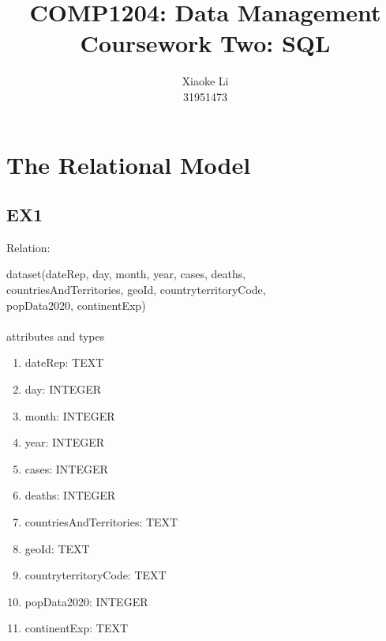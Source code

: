 \documentclass[]{article}
\title{COMP1204: Data Management \\ Coursework Two: SQL }
\author{Xiaoke Li \\ 31951473}
\begin{document}
\maketitle
\newpage

\section{The Relational Model}

\subsection{EX1}

Relation: 


dataset(dateRep, day, month, year, cases, deaths,\\ countriesAndTerritories, geoId, countryterritoryCode,\\ popData2020, continentExp)\\ \\

attributes and types
\begin{enumerate}
    \item dateRep: TEXT
    \item day: INTEGER
    \item month: INTEGER
    \item year: INTEGER
    \item cases: INTEGER
    \item deaths: INTEGER
    \item countriesAndTerritories: TEXT
    \item geoId: TEXT
    \item countryterritoryCode: TEXT
    \item popData2020: INTEGER
    \item continentExp: TEXT
\end{enumerate}
\end{document}
